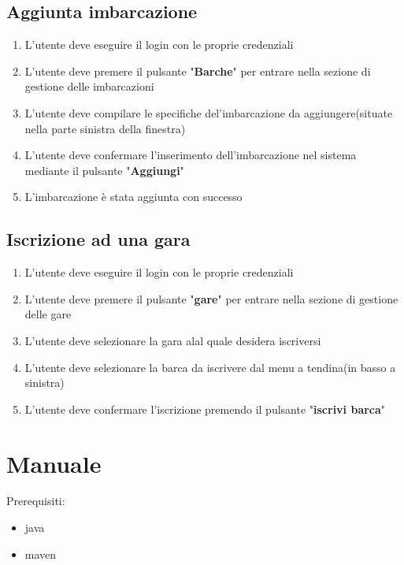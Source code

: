 \documentclass{report}
\begin{document}
    \section{Aggiunta imbarcazione}
    \begin{enumerate}
      \item L'utente deve eseguire il login con le proprie credenziali
      \item L'utente deve premere il pulsante "\textbf{Barche}" per entrare nella sezione di gestione delle imbarcazioni
      \item L'utente deve compilare le specifiche del'imbarcazione da aggiungere(situate nella parte sinistra della finestra)
      \item L'utente deve confermare l'inserimento dell'imbarcazione nel sistema mediante il pulsante "\textbf{Aggiungi}"
      \item L'imbarcazione è stata aggiunta con successo
    \end{enumerate}

    \section{Iscrizione ad una gara}
    \begin{enumerate}
      \item L'utente deve eseguire il login con le proprie credenziali
      \item L'utente deve premere il pulsante "\textbf{gare}" per entrare nella sezione di gestione delle gare
      \item L'utente deve selezionare la gara alal quale desidera iscriversi
      \item L'utente deve selezionare la barca da iscrivere dal menu a tendina(in basso a sinistra)
      \item L'utente deve confermare l'iscrizione premendo il pulsante "\textbf{iscrivi barca}"
    \end{enumerate}
    


    \chapter{Manuale} %
    \label{cha:Manuale}
    Prerequisiti:
    \begin{itemize}
      \item java
      \item maven
    \end{itemize}
\end{document}
